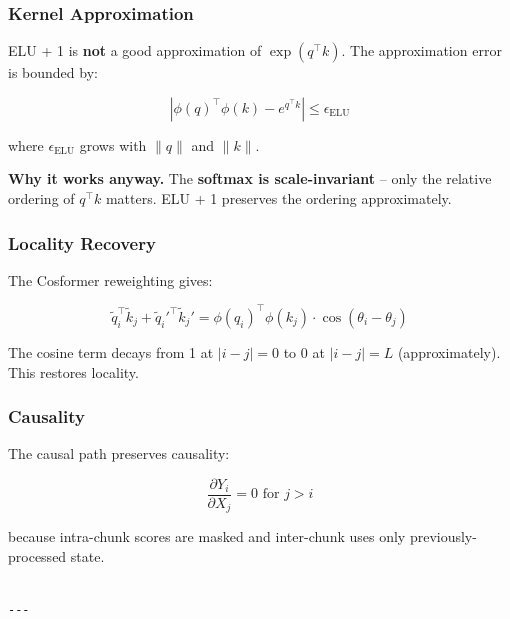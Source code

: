 \subsubsection{Kernel Approximation}

ELU + 1 is \textbf{not} a good approximation of $\exp(q^\top k)$. The 
approximation error is bounded by:

\begin{equation}
\left|\phi(q)^\top \phi(k) - e^{q^\top k}\right| \leq \epsilon_\text{ELU}
\end{equation}

where $\epsilon_\text{ELU}$ grows with $\|q\|$ and $\|k\|$.

\textbf{Why it works anyway.} The \textbf{softmax is scale-invariant} -- only the 
relative ordering of $q^\top k$ matters. ELU + 1 preserves the ordering 
approximately.

\subsubsection{Locality Recovery}

The Cosformer reweighting gives:

\begin{equation}
\tilde{q}_i^\top \tilde{k}_j + \tilde{q}_i'^\top \tilde{k}_j' = \phi(q_i)^\top \phi(k_j) \cdot \cos(\theta_i - \theta_j)
\end{equation}

The cosine term decays from 1 at $|i - j| = 0$ to 0 at $|i - j| = L$ 
(approximately). This restores locality.

\subsubsection{Causality}

The causal path preserves causality:

\begin{equation}
\frac{\partial Y_i}{\partial X_j} = 0 \text{ for } j > i
\end{equation}

because intra-chunk scores are masked and inter-chunk uses only 
previously-processed state.
\begin{lstlisting}

---
\end{lstlisting}